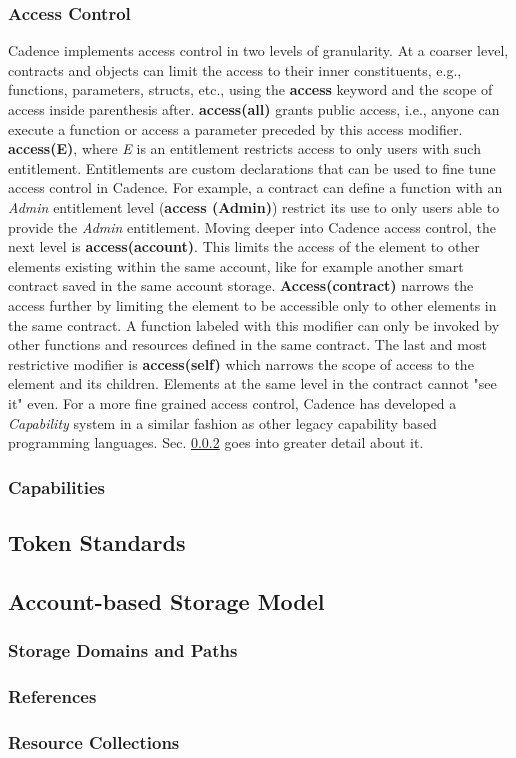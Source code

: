 \documentclass[../NFTComp_IEEE.tex]{subfiles}
\begin{document}
\subsubsection{Access Control}
Cadence implements access control in two levels of granularity. At a coarser level, contracts and objects can limit the access to their inner constituents, e.g., functions, parameters, structs, etc., using the \textbf{access} keyword and the scope of access inside parenthesis after. \textbf{access(all)} grants public access, i.e., anyone can execute a function or access a parameter preceded by this access modifier. \textbf{access(E)}, where \textit{E} is an entitlement restricts access to only users with such entitlement. Entitlements are custom declarations that can be used to fine tune access control in Cadence. For example, a contract can define a function with an \textit{Admin} entitlement level (\textbf{access (Admin)}) restrict its use to only users able to provide the \textit{Admin} entitlement. Moving deeper into Cadence access control, the next level is \textbf{access(account)}. This limits the access of the element to other elements existing within the same account, like for example another smart contract saved in the same account storage. \textbf{Access(contract)} narrows the access further by limiting the element to be accessible only to other elements in the same contract. A function labeled with this modifier can only be invoked by other functions and resources defined in the same contract. The last and most restrictive modifier is \textbf{access(self)} which narrows the scope of access to the element and its children. Elements at the same level in the contract cannot "see it" even. For a more fine grained access control, Cadence has developed a \textit{Capability} system in a similar fashion as other legacy capability based programming languages. Sec. \ref{sec:cadence_capabilities} goes into greater detail about it.

\subsubsection{Capabilities}
\label{sec:cadence_capabilities}

\subsection{Token Standards}

\subsection{Account-based Storage Model}
\subsubsection{Storage Domains and Paths}
\subsubsection{References}
\subsubsection{Resource Collections}
\end{document}
